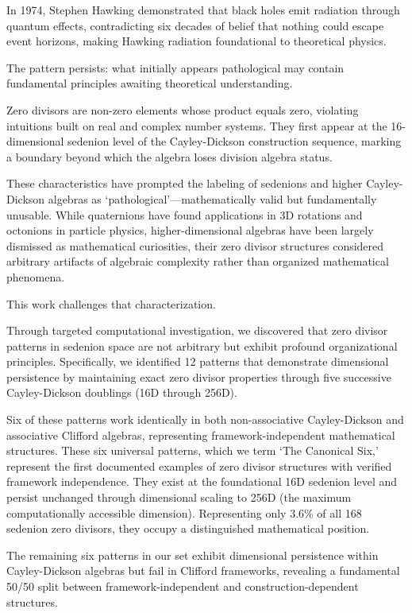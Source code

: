 \documentclass[11pt]{article}
\begin{document}
In 1974, Stephen Hawking demonstrated that black holes emit radiation through quantum effects, contradicting six decades of belief that nothing could escape event horizons, making Hawking radiation foundational to theoretical physics.

The pattern persists: what initially appears pathological may contain fundamental principles awaiting theoretical understanding.

Zero divisors are non-zero elements whose product equals zero, violating intuitions built on real and complex number systems. They first appear at the 16-dimensional sedenion level of the Cayley-Dickson construction sequence, marking a boundary beyond which the algebra loses division algebra status.

These characteristics have prompted the labeling of sedenions and higher Cayley-Dickson algebras as `pathological'---mathematically valid but fundamentally unusable. While quaternions have found applications in 3D rotations and octonions in particle physics, higher-dimensional algebras have been largely dismissed as mathematical curiosities, their zero divisor structures considered arbitrary artifacts of algebraic complexity rather than organized mathematical phenomena.

This work challenges that characterization.

Through targeted computational investigation, we discovered that zero divisor patterns in sedenion space are not arbitrary but exhibit profound organizational principles. Specifically, we identified 12 patterns that demonstrate dimensional persistence by maintaining exact zero divisor properties through five successive Cayley-Dickson doublings (16D through 256D).

Six of these patterns work identically in both non-associative Cayley-Dickson and associative Clifford algebras, representing framework-independent mathematical structures. These six universal patterns, which we term `The Canonical Six,' represent the first documented examples of zero divisor structures with verified framework independence. They exist at the foundational 16D sedenion level and persist unchanged through dimensional scaling to 256D (the maximum computationally accessible dimension). Representing only 3.6\% of all 168 sedenion zero divisors, they occupy a distinguished mathematical position.

The remaining six patterns in our set exhibit dimensional persistence within Cayley-Dickson algebras but fail in Clifford frameworks, revealing a fundamental 50/50 split between framework-independent and construction-dependent structures.
\end{document}
